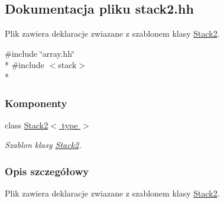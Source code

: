 \hypertarget{stack2_8hh}{\subsection{Dokumentacja pliku stack2.\-hh}
\label{stack2_8hh}
}


Plik zawiera deklaracje zwiazane z szablonem klasy \hyperlink{class_stack2}{Stack2}.  


{\ttfamily \#include \char`\"{}array.\-hh\char`\"{}}\\*
{\ttfamily \#include $<$stack$>$}\\*
\subsubsection*{Komponenty}
\begin{DoxyCompactItemize}
\item 
class \hyperlink{class_stack2}{Stack2$<$ type $>$}
\begin{DoxyCompactList}\small\item\em Szablon klasy \hyperlink{class_stack2}{Stack2}. \end{DoxyCompactList}\end{DoxyCompactItemize}


\subsubsection{Opis szczegółowy}
Plik zawiera deklaracje zwiazane z szablonem klasy \hyperlink{class_stack2}{Stack2}. 